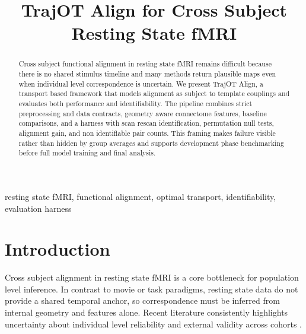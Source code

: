 \documentclass[conference]{IEEEtran}
\begin{document}
\title{TrajOT Align for Cross Subject Resting State fMRI}

\author{
}

\maketitle

\begin{abstract}
Cross subject functional alignment in resting state fMRI remains difficult because there is no shared stimulus timeline and many methods return plausible maps even when individual level correspondence is uncertain. We present TrajOT Align, a transport based framework that models alignment as subject to template couplings and evaluates both performance and identifiability. The pipeline combines strict preprocessing and data contracts, geometry aware connectome features, baseline comparisons, and a harness with scan rescan identification, permutation null tests, alignment gain, and non identifiable pair counts. This framing makes failure visible rather than hidden by group averages and supports development phase benchmarking before full model training and final analysis.
\end{abstract}

\begin{IEEEkeywords}
resting state fMRI, functional alignment, optimal transport, identifiability, evaluation harness
\end{IEEEkeywords}

\section{Introduction}
Cross subject alignment in resting state fMRI is a core bottleneck for population level inference. In contrast to movie or task paradigms, resting state data do not provide a shared temporal anchor, so correspondence must be inferred from internal geometry and features alone. Recent literature consistently highlights uncertainty about individual level reliability and external validity across cohorts \cite{b1,b2,b3,b4}.
\end{document}
